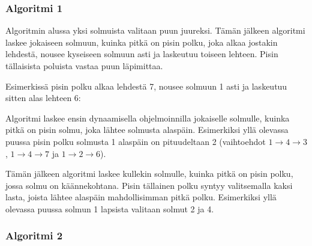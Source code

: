 \subsubsection{Algoritmi 1}

Algoritmin alussa
yksi solmuista valitaan puun juureksi.
Tämän jälkeen algoritmi laskee
jokaiseen solmuun,
kuinka pitkä on pisin polku,
joka alkaa jostakin lehdestä,
nousee kyseiseen solmuun asti
ja laskeutuu toiseen lehteen.
Pisin tällaisista poluista vastaa puun läpimittaa.

Esimerkissä pisin polku alkaa lehdestä 7,
nousee solmuun 1 asti ja laskeutuu
sitten alas lehteen 6:
\begin{center}
\end{center}

Algoritmi laskee ensin dynaamisella ohjelmoinnilla
jokaiselle solmulle, kuinka pitkä on pisin solmu,
joka lähtee solmusta alaspäin.
Esimerkiksi yllä olevassa puussa pisin polku
solmusta 1 alaspäin on pituudeltaan 2
(vaihtoehdot $1 \rightarrow 4 \rightarrow 3$,
$1 \rightarrow 4 \rightarrow 7$ ja $1 \rightarrow 2 \rightarrow 6$).

Tämän jälkeen algoritmi laskee kullekin solmulle,
kuinka pitkä on pisin polku, jossa solmu on käännekohtana.
Pisin tällainen polku syntyy valitsemalla kaksi lasta,
joista lähtee alaspäin mahdollisimman pitkä polku.
Esimerkiksi yllä olevassa puussa solmun 1 lapsista valitaan solmut 2 ja 4.

\subsubsection{Algoritmi 2}

